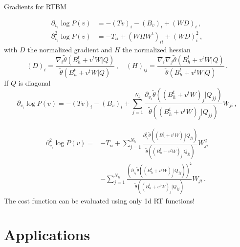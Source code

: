 \documentclass[10pt]{beamer}
\begin{document}
\begin{frame}{Gradients for RTBM}

    \begin{equation*}
        \begin{split}
         \partial_{v_i} \log{P(v)} &= - ( T v)_i - (B_v)_i + ( W D)_i\,,\\
         \partial^2_{v_i} \log{P(v)} &= - T _{ii} + (W H W^t)_{ii} + ( W D)^2_i\,,
       \end{split}   
       \end{equation*}
       with $D$ the normalized gradient and $H$ the normalized hessian 
       \begin{equation*}
           (D)_i = \frac{\nabla_i \tilde{\theta}(B^t_h+v^t W \vert Q)}{\tilde{\theta}(B^t_h+v^t W \vert Q)} 
           \,, \quad
           (H)_{ij} = \frac{\nabla_i \nabla_j \tilde{\theta}(B^t_h+v^t W \vert Q)}{\tilde{\theta}(B^t_h+v^t W \vert Q)}\,.
       \end{equation*}
       If $Q$ is diagonal 
       \begin{equation*}
        \partial_{v_i} \log{P(v)} = - ( T v)_i - (B_v)_i + \sum_{j=1}^{N_h} \frac{\partial_{v_i} \tilde{\theta}((B^t_h+v^t W)_j \vert Q_{jj})}{\tilde{\theta}((B^t_h+v^t W)_j \vert Q_{jj})} W_{ji}\,,
   \end{equation*}
   
   \begin{equation*}
   \begin{split}
        \partial_{v_i}^2 \log{P(v)} =& - T_{ii} + 
        \sum_{j=1}^{N_h} \frac{\partial^2_{v_i} \tilde{\theta}((B^t_h+v^t W)_j \vert Q_{jj})}
        {\tilde{\theta}((B^t_h+v^t W)_j \vert Q_{jj})} W_{ji}^2\\
        &
        - 
        \sum_{j=1}^{N_h} \frac{(\partial_{v_i} \tilde{\theta}((B^t_h+v^t W)_j \vert Q_{jj}))^2}
        {\tilde{\theta}((B^t_h+v^t W)_j \vert Q_{jj})} W_{ji}\,.
   \end{split}
   \end{equation*}
   The cost function can be evaluated using only 1d RT functions!
\end{frame}

\section{Applications}
\end{document}
